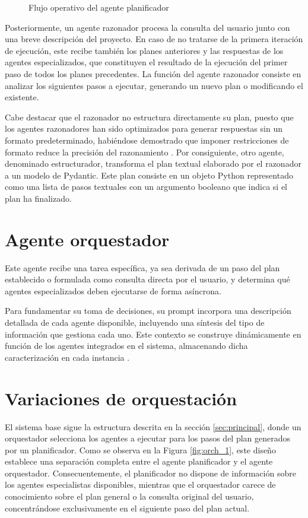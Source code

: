 \begin{figure}[h]
\centering
{}
\caption{Flujo operativo del agente planificador}
\label{fig:planner}
\end{figure}
Posteriormente, un agente razonador procesa la consulta del usuario junto con una breve descripción del proyecto. En caso de no tratarse de la primera iteración de ejecución, este recibe también los planes anteriores y las respuestas de los agentes especializados, que constituyen el resultado de la ejecución del primer paso de todos los planes precedentes. La función del agente razonador consiste en analizar los siguientes pasos a ejecutar, generando un nuevo plan o modificando el existente.

Cabe destacar que el razonador no estructura directamente su plan, puesto que los agentes razonadores han sido optimizados para generar respuestas sin un formato predeterminado, habiéndose demostrado que imponer restricciones de formato reduce la precisión del razonamiento \cite{tam_let_2024}. Por consiguiente, otro agente, denominado estructurador, transforma el plan textual elaborado por el razonador a un modelo de Pydantic. Este plan consiste en un objeto Python representado como una lista de pasos textuales con un argumento booleano que indica si el plan ha finalizado.

\section{Agente orquestador}
\label{sec:agente_orquestador}
Este agente recibe una tarea específica, ya sea derivada de un paso del plan establecido o formulada como consulta directa por el usuario, y determina qué agentes especializados deben ejecutarse de forma asíncrona.

Para fundamentar su toma de decisiones, su prompt incorpora una descripción detallada de cada agente disponible, incluyendo una síntesis del tipo de información que gestiona cada uno. Este contexto se construye dinámicamente en función de los agentes integrados en el sistema, almacenando dicha caracterización en cada instancia .

\section{Variaciones de orquestación}
\label{sec:vars}
El sistema base sigue la estructura descrita en la sección \ref{sec:principal}, donde un orquestador selecciona los agentes a ejecutar para los pasos del plan generados por un planificador. Como se observa en la Figura \ref{fig:orch_1}, este diseño establece una separación completa entre el agente planificador y el agente orquestador. Consecuentemente, el planificador no dispone de información sobre los agentes especialistas disponibles, mientras que el orquestador carece de conocimiento sobre el plan general o la consulta original del usuario, concentrándose exclusivamente en el siguiente paso del plan actual.

